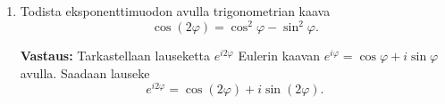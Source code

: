 \documentclass[a4paper,12pt]{article}
\begin{document}
\begin{enumerate}
Ratkotaan $x$ jälkimmäisestä yhtälöstä:
\begin{align*}
    (x-3)^2+y^2&=16\\
    x^2+2\cdot x\cdot (-3)+(-3)^2+y^2&=16\\
    x^2-6x+9+y^2&=16\\
    -6x+9+9&=16 \quad \text{(sijoitetaan toinen yhtälö)}\\
    18-6x&=16\\
    -6x&=-2\\
    x&=\frac{1}{3}
\end{align*}

Sijoitetaan muuttujan $x$ arvo yhtälöön $x^2+y^2=9$:
\begin{align*}
    \left(\frac{1}{3}\right)^2+y^2&=9\\
    y^2&=9-\frac{1}{9} \\
    y&= \pm\sqrt{\frac{80}{9}}\\
    y&=\pm \frac{4\cdot\sqrt{5}}{3}
\end{align*}

Nyt kun meillä on $x$ ja $y$, voidaan johtaa kuvioiden leikkaupisteet: 
\begin{itemize}
    \item $\left( \frac{1}{3},\frac{4\cdot\sqrt{5}}{3}i\right) \quad \approx \quad (0.33,2.98i)$
    \item $\left(\frac{1}{3},-\frac{4\cdot\sqrt{5}}{3}i\right) \quad \approx \quad (0.33,-2.98i)$.
\end{itemize}
\vspace{1em}

\item Todista eksponenttimuodon avulla trigonometrian kaava
\[
\cos(2\varphi)=\cos^2\varphi-\sin^2\varphi.
\]

\textbf{Vastaus:} Tarkastellaan lauseketta $e^{i2\varphi}$ Eulerin kaavan $e^{i\varphi}=\cos\varphi+i\sin\varphi$ avulla. Saadaan lauseke 
\begin{equation*}
    e^{i2\varphi}=\cos(2\varphi)+i\sin(2\varphi).
\end{equation*}


\end{enumerate}
\end{document}
